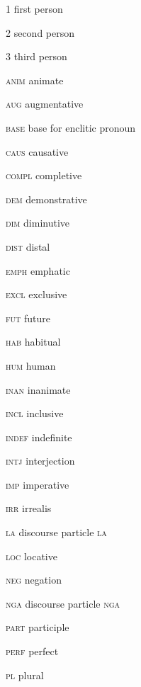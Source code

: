 
    
\begin{multicols}{2} 



\textsc{1}    \hfill        first person \

\textsc{2}      \hfill      second person \

\textsc{3}       \hfill       third person \

\textsc{anim}    \hfill        animate \

\textsc{aug} \hfill   augmentative    \

\textsc{base}  \hfill   base for enclitic pronoun \

\textsc{caus}   \hfill  causative  \

\textsc{compl}  \hfill  completive \

\textsc{dem}  \hfill  demonstrative \

\textsc{dim} \hfill   diminutive \

\textsc{dist}  \hfill  distal \

\textsc{emph} \hfill   emphatic \

\textsc{excl} \hfill   exclusive \

\textsc{fut} \hfill  future \

\textsc{hab} \hfill  habitual \

\textsc{hum} \hfill  human \

\textsc{inan} \hfill  inanimate \

\textsc{incl} \hfill  inclusive \

\textsc{indef} \hfill  indefinite \

\textsc{intj} \hfill  interjection \

\textsc{imp} \hfill  imperative \

\textsc{irr} \hfill  irrealis \

\textsc{la} \hfill  discourse particle \textsc{la}  \

\textsc{loc} \hfill  locative \

\textsc{neg} \hfill  negation \

\textsc{nga} \hfill  discourse particle \textsc{nga}  \

\textsc{part} \hfill  participle \

\textsc{perf} \hfill  perfect  \

\textsc{pl} \hfill  plural \


\end{multicols}
